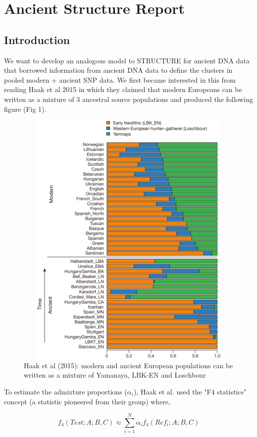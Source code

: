 \documentclass[11pt]{article}
\begin{document}
\section{Ancient Structure Report}

\subsection{Introduction}

We want  to develop an analogous model to STRUCTURE for ancient DNA data that borrowed information from ancient DNA data to define the clusters in pooled modern + ancient SNP data. We first became interested in this from reading Haak et al 2015 in which they claimed that modern Europeans can be written as a mixture of 3 ancestral source populations and produced the following figure (Fig 1).

\begin{figure}[ht]
\includegraphics[width=5in, height=5in]{../nature14317-f3.png}
\caption{Haak et al (2015): modern and ancient European populations can be written as a mixture of Yamanaya, LBK-EN and Loschbour}
\end{figure}

To estimate the admixture proportions ($\alpha_i$), Haak et al. used the "F4 statistics" concept (a statistic pioneered from their group) where,

$$f_4(Test; A; B, C) \approx \sum_{i=1}^N \alpha_i f_4(Ref_i; A; B,C)$$
\end{document}
